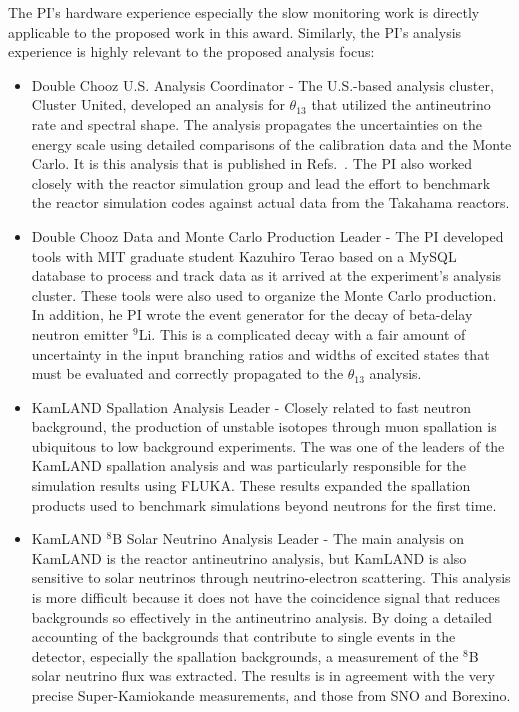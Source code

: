 The PI's hardware experience especially the slow monitoring work is directly applicable to the proposed work in this award. Similarly, the PI's analysis experience is highly relevant to the proposed analysis focus:
\begin{itemize}
  \item Double Chooz U.S. Analysis Coordinator - The U.S.-based analysis cluster, Cluster United, developed an analysis for $\theta_{13}$  that utilized the antineutrino rate and spectral shape. The analysis propagates the uncertainties on the energy scale using detailed comparisons of the calibration data  and the Monte Carlo. It is this analysis that is published in Refs.~\cite{dcone,dctwo,dchydrogen}. The PI also worked closely with the reactor simulation group and lead the effort to benchmark the reactor simulation codes against actual data from the Takahama reactors\cite{takahama}.
  \item Double Chooz Data and Monte Carlo Production Leader - The PI developed tools with MIT graduate student Kazuhiro Terao based on a MySQL database to process and track data as it arrived at the experiment's analysis cluster. These tools were also used to organize the Monte Carlo production. In addition, he PI wrote the event generator for the decay of beta-delay neutron emitter $^{9}$Li. This is a complicated decay with a fair amount of uncertainty in the input branching ratios and widths of excited states that must be evaluated and correctly propagated to the $\theta_{13}$ analysis.
  \item KamLAND Spallation Analysis Leader - Closely related to fast neutron background, the production of unstable isotopes through muon spallation is ubiquitous to low background experiments. The was one of the leaders of the KamLAND spallation analysis and was particularly responsible for the simulation results using FLUKA\cite{kamspall}. These results expanded the spallation products used to benchmark simulations beyond neutrons for the first time. 
\item KamLAND $^{8}$B Solar Neutrino Analysis Leader - The main analysis on KamLAND is the reactor antineutrino analysis, but KamLAND is also sensitive to solar neutrinos through neutrino-electron scattering. This analysis is more difficult because it does not have the coincidence signal that reduces backgrounds so effectively in the antineutrino analysis.  By doing a detailed accounting of the backgrounds that contribute to single events in the detector, especially the spallation backgrounds, a measurement of the $^{8}$B solar neutrino flux was extracted\cite{kamboron}. The results is in agreement with the very precise Super-Kamiokande measurements\cite{skboron}, and those from SNO\cite{snoboron} and Borexino\cite{borexinoboron}. 
\end{itemize}

